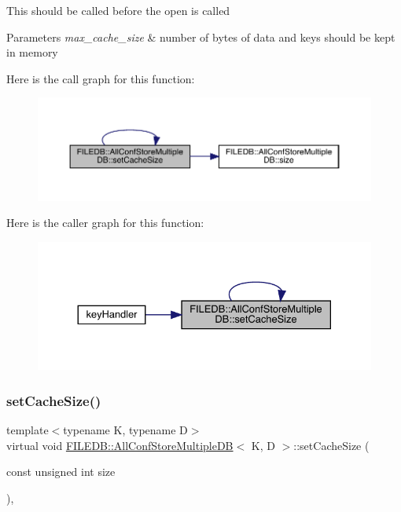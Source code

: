 This should be called before the open is called 
\begin{DoxyParams}{Parameters}
{\em max\+\_\+cache\+\_\+size} & number of bytes of data and keys should be kept in memory \\
\hline
\end{DoxyParams}
Here is the call graph for this function\+:
\nopagebreak
\begin{figure}[H]
\begin{center}
\leavevmode
\includegraphics[width=350pt]{d5/dbe/classFILEDB_1_1AllConfStoreMultipleDB_a746ef51b2dedf529a8e85528c0d31bfc_cgraph}
\end{center}
\end{figure}
Here is the caller graph for this function\+:\nopagebreak
\begin{figure}[H]
\begin{center}
\leavevmode
\includegraphics[width=330pt]{d5/dbe/classFILEDB_1_1AllConfStoreMultipleDB_a746ef51b2dedf529a8e85528c0d31bfc_icgraph}
\end{center}
\end{figure}
\mbox{\label{classFILEDB_1_1AllConfStoreMultipleDB_a746ef51b2dedf529a8e85528c0d31bfc}} 
\subsubsection{\texorpdfstring{setCacheSize()}{setCacheSize()}\hspace{0.1cm}{\footnotesize\ttfamily [2/2]}}
{\footnotesize\ttfamily template$<$typename K, typename D$>$ \\
virtual void \mbox{\hyperlink{classFILEDB_1_1AllConfStoreMultipleDB}{F\+I\+L\+E\+D\+B\+::\+All\+Conf\+Store\+Multiple\+DB}}$<$ K, D $>$\+::set\+Cache\+Size (\begin{DoxyParamCaption}\item[{const unsigned int}]{size }\end{DoxyParamCaption})\hspace{0.3cm}{\ttfamily [inline]}, {\ttfamily [virtual]}}

